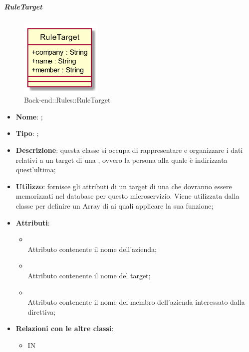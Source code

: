 \hypertarget{RuleTarget_label}{\subparagraph{RuleTarget}}
\begin{figure}[h]
	\centering
	\includegraphics[width=0.35\textwidth,height=\textheight,keepaspectratio]{images/ClassRuleTarget.png}
	\caption{Back-end::Rules::RuleTarget}
\end{figure}
\begin{itemize}
	\item \textbf{Nome}: ;
	\item \textbf{Tipo}: ;
	\item \textbf{Descrizione}: questa classe si occupa di rappresentare e organizzare i dati relativi a un target di una , ovvero la persona alla quale è indirizzata quest'ultima;
	\item \textbf{Utilizzo}: fornisce gli attributi di un target di una  che dovranno essere memorizzati nel database per questo microservizio.
Viene utilizzata dalla classe  per definire un Array di  ai quali applicare la sua funzione;
	\item \textbf{Attributi}:
	\begin{itemize}
		\item[]  \\
		Attributo contenente il nome dell'azienda;
		\item[]  \\
		Attributo contenente il nome del target;
		\item[]  \\
		Attributo contenente il nome del membro dell'azienda interessato dalla direttiva;
	\end{itemize}
	\item \textbf{Relazioni con le altre classi}:
	\begin{itemize}
		\item IN \hyperlink{Rule_label}{}
	\end{itemize}
\end{itemize}
\FloatBarrier

